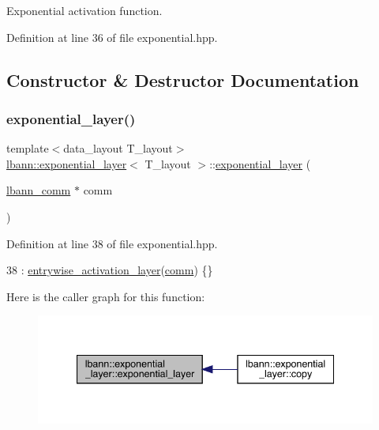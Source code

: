 Exponential activation function. 

Definition at line 36 of file exponential.\+hpp.



\subsection{Constructor \& Destructor Documentation}
\mbox{\label{classlbann_1_1exponential__layer_a1a0d4f1be9f58235782f04c215589360}} 
\subsubsection{\texorpdfstring{exponential\+\_\+layer()}{exponential\_layer()}}
{\footnotesize\ttfamily template$<$data\+\_\+layout T\+\_\+layout$>$ \\
\hyperlink{classlbann_1_1exponential__layer}{lbann\+::exponential\+\_\+layer}$<$ T\+\_\+layout $>$\+::\hyperlink{classlbann_1_1exponential__layer}{exponential\+\_\+layer} (\begin{DoxyParamCaption}\item[{\hyperlink{classlbann_1_1lbann__comm}{lbann\+\_\+comm} $\ast$}]{comm }\end{DoxyParamCaption})\hspace{0.3cm}{\ttfamily [inline]}}



Definition at line 38 of file exponential.\+hpp.


\begin{DoxyCode}
38 : \hyperlink{classlbann_1_1entrywise__activation__layer_aada1d9200612dcd13259799ef327c557}{entrywise\_activation\_layer}(\hyperlink{file__io_8cpp_ab048c6f9fcbcfaa57ce68b00263dbebe}{comm}) \{\}
\end{DoxyCode}
Here is the caller graph for this function\+:\nopagebreak
\begin{figure}[H]
\begin{center}
\leavevmode
\includegraphics[width=340pt]{classlbann_1_1exponential__layer_a1a0d4f1be9f58235782f04c215589360_icgraph}
\end{center}
\end{figure}


